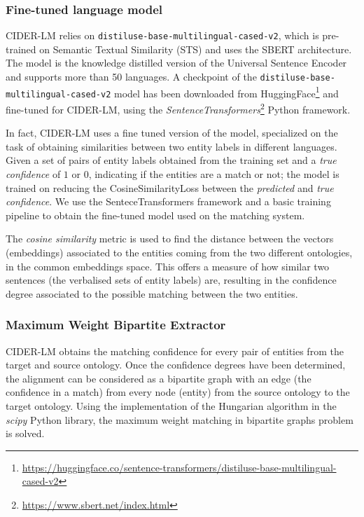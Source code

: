 \documentclass[
]{ceurart}
\begin{document}
\subsubsection{Fine-tuned language model}


 CIDER-LM relies on \verb|distiluse-base-multilingual-cased-v2|, which is pre-trained on Semantic Textual Similarity (STS) and uses the SBERT architecture. The model is the knowledge distilled version of the Universal Sentence Encoder and supports more than 50 languages. 
 A checkpoint of the \verb|distiluse-base-multilingual-cased-v2| model has been downloaded from HuggingFace\footnote{\url{https://huggingface.co/sentence-transformers/distiluse-base-multilingual-cased-v2}} and fine-tuned for CIDER-LM, using the \textit{SentenceTransformers}\footnote{\url{https://www.sbert.net/index.html}} Python framework.
 
 In fact, CIDER-LM uses a fine tuned version of the model, specialized on the task of obtaining similarities between two entity labels in different languages. Given a set of pairs of entity labels obtained from the training set and a \textit{true confidence} of $1$ or $0$, indicating if the entities are a match or not; the model is trained on reducing the CosineSimilarityLoss between the \textit{predicted} and \textit{true confidence}. We use the SenteceTransformers framework and a basic training pipeline to obtain the fine-tuned model used on the matching system. 

The \textit{cosine similarity} metric is used to find the distance between the vectors (embeddings) associated to the entities coming from the two different ontologies, in the common embeddings space. This offers a measure of how similar two sentences (the verbalised sets of entity labels) are, resulting in the confidence degree associated to the possible matching between the two entities. 

\subsubsection{Maximum Weight Bipartite Extractor}

CIDER-LM obtains the matching confidence for every pair of entities from the target and source ontology. Once the confidence degrees have been determined, the alignment can be considered as a bipartite graph with an edge (the confidence in a match) from every node (entity) from the source ontology to the target ontology. Using the implementation of the Hungarian algorithm in the \textit{scipy} Python library, the maximum weight matching in bipartite graphs problem is solved. 
\end{document}
